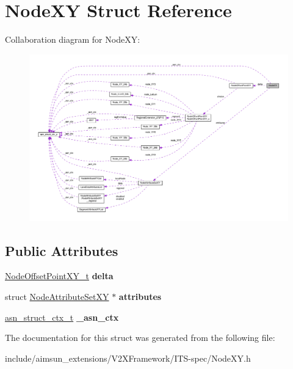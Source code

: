 \hypertarget{structNodeXY}{}\section{Node\+XY Struct Reference}
\label{structNodeXY}


Collaboration diagram for Node\+XY\+:\nopagebreak
\begin{figure}[H]
\begin{center}
\leavevmode
\includegraphics[width=350pt]{structNodeXY__coll__graph}
\end{center}
\end{figure}
\subsection*{Public Attributes}
\begin{DoxyCompactItemize}
\item 
\hyperlink{structNodeOffsetPointXY}{Node\+Offset\+Point\+X\+Y\+\_\+t} {\bfseries delta}\hypertarget{structNodeXY_a9251be88aad921f1a86133a64ee0e461}{}\label{structNodeXY_a9251be88aad921f1a86133a64ee0e461}

\item 
struct \hyperlink{structNodeAttributeSetXY}{Node\+Attribute\+Set\+XY} $\ast$ {\bfseries attributes}\hypertarget{structNodeXY_a232ebaac8e16c29cc72631c8f6ca5ae2}{}\label{structNodeXY_a232ebaac8e16c29cc72631c8f6ca5ae2}

\item 
\hyperlink{structasn__struct__ctx__s}{asn\+\_\+struct\+\_\+ctx\+\_\+t} {\bfseries \+\_\+asn\+\_\+ctx}\hypertarget{structNodeXY_aaa8bc6297cee87b562874fad0bfa7843}{}\label{structNodeXY_aaa8bc6297cee87b562874fad0bfa7843}

\end{DoxyCompactItemize}


The documentation for this struct was generated from the following file\+:\begin{DoxyCompactItemize}
\item 
include/aimsun\+\_\+extensions/\+V2\+X\+Framework/\+I\+T\+S-\/spec/Node\+X\+Y.\+h\end{DoxyCompactItemize}
